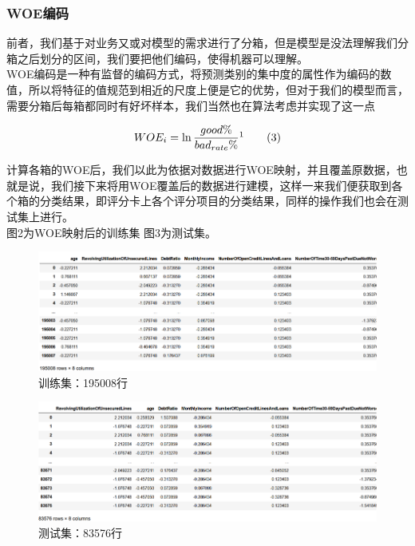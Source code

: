 \documentclass[12pt]{article}
\begin{document}
\subsubsection{WOE编码}
\begin{flushleft}
	\noindent\qquad 前者，我们基于对业务又或对模型的需求进行了分箱，但是模型是没法理解我们分箱之后划分的区间，我们要把他们编码，使得机器可以理解。\\
	\noindent\qquad WOE编码是一种有监督的编码方式，将预测类别的集中度的属性作为编码的数值，所以将特征的值规范到相近的尺度上便是它的优势，但对于我们的模型而言，需要分箱后每箱都同时有好坏样本，我们当然也在算法考虑并实现了这一点
	
\end{flushleft}



\begin{align}
WOE_i = \ln{\frac{good\%}{bad_{rate}\%}}\footnotemark[1] \tag{3}
\end{align}

\begin{flushleft}
	\noindent\qquad 计算各箱的WOE后，我们以此为依据对数据进行WOE映射，并且覆盖原数据，也就是说，我们接下来将用WOE覆盖后的数据进行建模，这样一来我们便获取到各个箱的分类结果，即评分卡上各个评分项目的分类结果，同样的操作我们也会在测试集上进行。\\
	\noindent\qquad 图2为WOE映射后的训练集 图3为测试集。
	
	
\end{flushleft}

\begin{figure}[H]
	\centering
	\includegraphics[width=1\linewidth]{figures/screenshot011}
	\caption{训练集：195008行}
	\label{训练集}
\end{figure}
\vspace{3cm}
\begin{figure}[H]
	\centering
	\includegraphics[width=1\linewidth]{figures/screenshot012}
	\caption{测试集：83576行}
	\label{测试集}
\end{figure}
\end{document}
